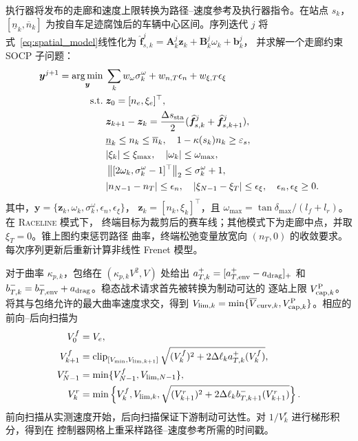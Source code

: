 \documentclass[final,5p,twocolumn]{elsarticle}
\DeclareMathOperator*{\argmin}{arg\,min}
\begin{document}
执行器将发布的走廊和速度上限转换为路径--速度参考及执行器指令。在站点 \(s_k\)，
\([\underline n_k,\overline n_k]\) 为按自车足迹腐蚀后的车辆中心区间。序列迭代 \(j\)
将式~\eqref{eq:spatial_model}线性化为
\(\widehat{\bm f}_{s,k}^{j}=\bm A_k^j\bm z_k+\bm B_k^j\omega_k+\bm b_k^j\)，
并求解一个走廊约束 SOCP 子问题：
\begingroup
\setlength{\arraycolsep}{2pt}
\footnotesize
\begin{equation}
\begin{aligned}
\bm y^{j+1}=\argmin_{\bm y}\;&
\sum_kw_\omega\sigma_k^\omega
+w_{n,T}\epsilon_n+w_{\xi,T}\epsilon_\xi\\
\mathrm{s.t.}\;&\bm z_0=[n_e,\xi_e]^\top,\\
&\bm z_{k+1}-\bm z_k=\frac{\Delta s_{\rm sta}}{2}
 (\widehat{\bm f}_{s,k}^{j}+\widehat{\bm f}_{s,k+1}^{j}),\\
&\underline n_k\le n_k\le\overline n_k,\quad
1-\kappa(s_k)n_k\ge\varepsilon_s,\\
&|\xi_k|\le\xi_{\max},\quad |\omega_k|\le\omega_{\max},\\
&\left\|[2\omega_k,\sigma_k^\omega-1]^\top\right\|_2
\le\sigma_k^\omega+1,\\
&|n_{N-1}-n_T|\le\epsilon_n,\quad
|\xi_{N-1}-\xi_T|\le\epsilon_\xi,\quad
\epsilon_n,\epsilon_\xi\ge0 .
\end{aligned}
\label{eq:execution_socp}
\end{equation}
\endgroup
其中，\(\bm y=\{\bm z_k,\omega_k,\sigma_k^\omega,\epsilon_n,\epsilon_\xi\}\)，
\(\bm z_k=[n_k,\xi_k]^\top\)，且
\(\omega_{\max}=\tan\delta_{\max}/(l_f+l_r)\)。在 \textsc{Raceline} 模式下，
终端目标为裁剪后的赛车线；其他模式下为走廊中点，并取 \(\xi_T=0\)。锥上图约束惩罚路径
曲率，终端松弛变量放宽向 $(n_T,0)$ 的收敛要求。每次序列更新后重新计算非线性 Frenet 模型。

对于曲率 \(\kappa_{p,k}\)，包络在 \((\kappa_{p,k}V^2,V)\) 处给出
\(a_{T,k}^{+}=[a_{T,{\rm env}}^{+}-a_{\rm drag}]_+\) 和
\(b_{T,k}^{-}=b_{T,{\rm env}}^{-}+a_{\rm drag}\)。稳态战术请求首先被转换为制动可达的
逐站上限 $V_{{\rm cap},k}^{\rm P}$。将其与包络允许的最大曲率速度求交，得到
$V_{{\rm lim},k}=\min\{\overline V_{{\rm curv},k},
V_{{\rm cap},k}^{\rm P}\}$。相应的前向--后向扫描为
\begin{equation}
\begin{aligned}
V_0^f&=V_e,\\
V_{k+1}^{f}&=\operatorname{clip}_{[V_{\min},V_{{\rm lim},k+1}]}
\sqrt{(V_k^f)^2+2\Delta\ell_k a_{T,k}^{+}(V_k^f)},\\
V_{N-1}^r&=\min\{V_{N-1}^{f},V_{{\rm lim},N-1}\},\\
V_k^r&=\min\left\{V_k^f,V_{{\rm lim},k},
\sqrt{(V_{k+1}^r)^2+
2\Delta\ell_k b_{T,k+1}^{-}(V_{k+1}^r)}\right\}.
\end{aligned}
\label{eq:execution_speed_sweep}
\end{equation}
前向扫描从实测速度开始，后向扫描保证下游制动可达性。对 $1/V_k^r$ 进行梯形积分，得到在
控制器网格上重采样路径--速度参考所需的时间戳。
\end{document}
